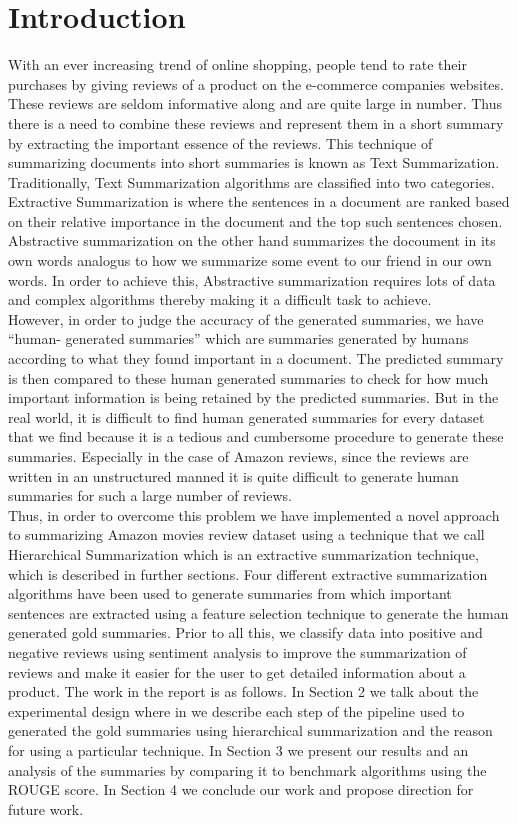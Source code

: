 \documentclass[conference]{IEEEtran}
\begin{document}
\section{Introduction}
With an ever increasing trend of online shopping, people tend to rate their purchases by
giving reviews of a product on the e-commerce companies websites. These reviews are
seldom informative along and are quite large in number. Thus there is a need to combine
these reviews and represent them in a short summary by extracting the important essence
of the reviews. This technique of summarizing documents into short summaries is known
as Text Summarization.
Traditionally, Text Summarization algorithms are classified into two categories. Extractive
Summarization is where the sentences in a document are ranked based on their relative
importance in the document and the top such sentences chosen. Abstractive summarization
on the other hand summarizes the docoument in its own words analogus to how we
summarize some event to our friend in our own words. In order to achieve this,
Abstractive summarization requires lots of data and complex algorithms thereby making it
a difficult task to achieve.\\
However, in order to judge the accuracy of the generated summaries, we have “human-
generated summaries” which are summaries generated by humans according to what they found important in a document. The predicted summary is then compared to these human
generated summaries to check for how much important information is being retained by
the predicted summaries. But in the real world, it is difficult to find human generated
summaries for every dataset that we find because it is a tedious and cumbersome
procedure to generate these summaries. Especially in the case of Amazon reviews, since the
reviews are written in an unstructured manned it is quite difficult to generate human summaries for such a
large number of reviews.\\
Thus, in order to overcome this problem we have implemented a novel approach to
summarizing Amazon movies review dataset using a technique that we call Hierarchical
Summarization which is an extractive summarization technique, which is described in further
sections. Four different extractive summarization algorithms have been used to generate summaries from which important sentences are extracted using a feature selection technique to generate the human
generated gold summaries. Prior to all this, we classify data into positive and negative reviews using
sentiment analysis to improve the summarization of reviews and make it easier for the user to get detailed
information about a product.
The work in the report is as follows. In Section 2 we talk about the experimental design
where in we describe each step of the pipeline used to generated the gold summaries using
hierarchical summarization and the reason for using a particular technique. In Section 3 we
present our results and an analysis of the summaries by comparing it to benchmark algorithms using the
ROUGE score. In Section 4 we conclude our work and propose direction for future work.
\end{document}
